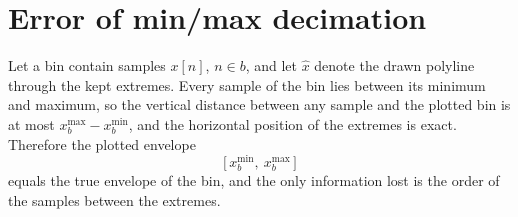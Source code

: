 \section{Error of min/max decimation}\label{app:mm}
Let a bin contain samples $x[n]$, $n\in b$, and let $\hat x$ denote the drawn polyline through the kept extremes. Every sample of the bin lies
between its minimum and maximum, so the vertical distance between any sample and the plotted bin is at most
$x^{\max}_b-x^{\min}_b$, and the horizontal position of the extremes is exact. Therefore the plotted envelope
\[
  \bigl[\,x^{\min}_b,\ x^{\max}_b\,\bigr]
\]
equals the true envelope of the bin, and the only information lost is the order of the samples between the extremes.
